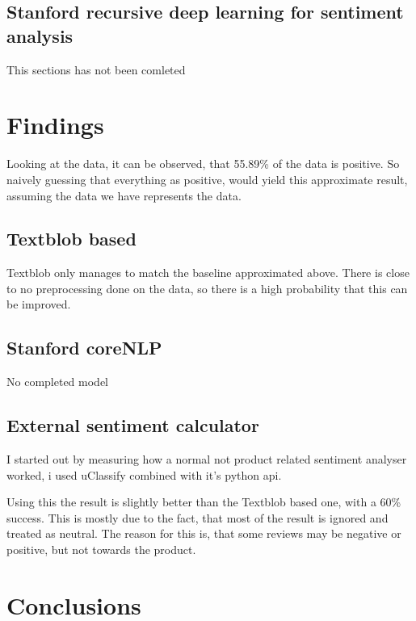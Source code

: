 \documentclass{sig-alternate}
\begin{document}
\subsection{Stanford recursive deep learning for sentiment analysis}
This sections has not been comleted


\section{Findings}
Looking at the data, it can be observed, that 55.89\% of the data is positive. So naively guessing that everything as positive, would yield this approximate result, assuming the data we have represents the data.

\subsection{Textblob based}
Textblob only manages to match the baseline approximated above. There is close to no preprocessing done on the data, so there is a high probability that this can be improved.
\subsection{Stanford coreNLP}
No completed model

\subsection{External sentiment calculator}
I started out by measuring how a normal not product related sentiment analyser worked, i used uClassify\cite{uClassify} combined with it's python api\cite{uClassifyp}. 

Using this the result is slightly better than the Textblob based one, with a 60\% success. This is mostly due to the fact, that most of the result is ignored and treated as neutral. The reason for this is, that some reviews may be negative or positive, but not towards the product.

\section{Conclusions}



%
%
\end{document}
